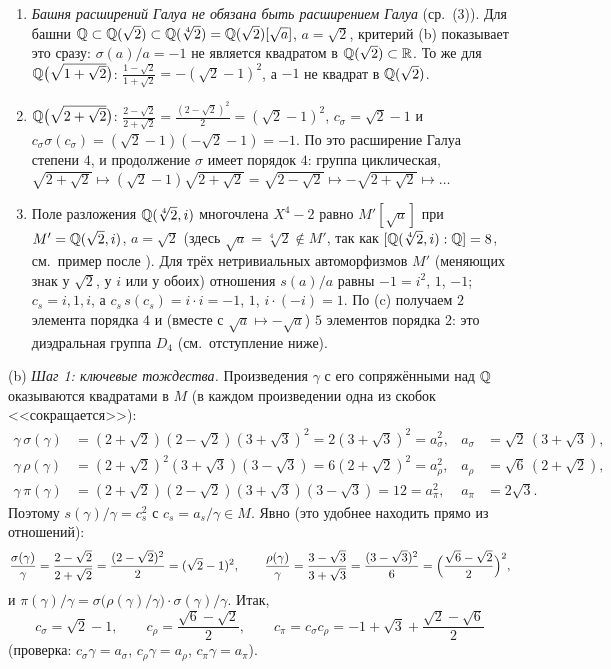 \begin{example}
\begin{enumerate}[label=(\arabic*),leftmargin=*]
\item \emph{Башня расширений Галуа не обязана быть расширением Галуа} (ср.\ (3)). Для башни
$\mathbb Q\subset\mathbb Q(\sqrt2)\subset\mathbb Q(\sqrt[4]2)=\mathbb Q(\sqrt2)[\sqrt a]$, $a=\sqrt2$, критерий (b) показывает это сразу:
$\sigma(a)/a=-1$ не является квадратом в $\mathbb Q(\sqrt2)\subset\mathbb R$. То же для $\mathbb Q\bigl(\sqrt{1+\sqrt2}\bigr)$:
$\frac{1-\sqrt2}{1+\sqrt2}=-(\sqrt2-1)^2$, а $-1$ не квадрат в $\mathbb Q(\sqrt2)$.
\item $\mathbb Q\bigl(\sqrt{2+\sqrt2}\bigr)$: $\frac{2-\sqrt2}{2+\sqrt2}=\frac{(2-\sqrt2)^2}2=(\sqrt2-1)^2$, $c_\sigma=\sqrt2-1$ и
$c_\sigma\sigma(c_\sigma)=(\sqrt2-1)(-\sqrt2-1)=-1$. По  это расширение Галуа степени $4$, и продолжение $\sigma$
имеет порядок $4$: группа циклическая, $\sqrt{2+\sqrt2}\mapsto(\sqrt2-1)\sqrt{2+\sqrt2}=\sqrt{2-\sqrt2}\mapsto-\sqrt{2+\sqrt2}\mapsto\dots$
\item Поле разложения $\mathbb Q(\sqrt[4]2,i)$ многочлена $X^4-2$ равно $M'[\sqrt a]$ при $M'=\mathbb Q(\sqrt2,i)$, $a=\sqrt2$ (здесь $\sqrt a=\sqrt[4]2\notin M'$, так как
$[\mathbb Q(\sqrt[4]2,i):\mathbb Q]=8$, см.\ пример после ). Для трёх
нетривиальных автоморфизмов $M'$ (меняющих знак у $\sqrt2$, у $i$ или у обоих) отношения $s(a)/a$ равны $-1=i^2$, $1$, $-1$;
$c_s=i,1,i$, а $c_s\,s(c_s)=i\cdot i=-1$, $1$, $i\cdot(-i)=1$. По (c) получаем $2$ элемента порядка $4$ и
(вместе с $\sqrt a\mapsto-\sqrt a$) $5$ элементов порядка $2$: это диэдральная группа $D_4$ (см.\ отступление ниже).
\end{enumerate}
\end{example}

\noindent(b) \emph{Шаг 1: ключевые тождества.} Произведения $\gamma$ с его сопряжёнными над $\mathbb Q$ оказываются квадратами в $M$
(в каждом произведении одна из скобок <<сокращается>>):
\begin{align*}
\gamma\,\sigma(\gamma)&=(2+\sqrt2)(2-\sqrt2)(3+\sqrt3)^2=2(3+\sqrt3)^2=a_\sigma^2, & a_\sigma&=\sqrt2\,(3+\sqrt3),\\
\gamma\,\rho(\gamma)&=(2+\sqrt2)^2(3+\sqrt3)(3-\sqrt3)=6(2+\sqrt2)^2=a_\rho^2, & a_\rho&=\sqrt6\,(2+\sqrt2),\\
\gamma\,\pi(\gamma)&=(2+\sqrt2)(2-\sqrt2)(3+\sqrt3)(3-\sqrt3)=12=a_\pi^2, & a_\pi&=2\sqrt3 .
\end{align*}
Поэтому $s(\gamma)/\gamma=c_s^2$ с $c_s=a_s/\gamma\in M$. Явно (это удобнее находить прямо из отношений):
\[
\frac{\sigma(\gamma)}\gamma=\frac{2-\sqrt2}{2+\sqrt2}=\frac{(2-\sqrt2)^2}2=(\sqrt2-1)^2,\qquad
\frac{\rho(\gamma)}\gamma=\frac{3-\sqrt3}{3+\sqrt3}=\frac{(3-\sqrt3)^2}6=\Bigl(\frac{\sqrt6-\sqrt2}2\Bigr)^2,
\]
и $\pi(\gamma)/\gamma=\sigma\bigl(\rho(\gamma)/\gamma\bigr)\cdot\sigma(\gamma)/\gamma$. Итак,
\[
c_\sigma=\sqrt2-1,\qquad c_\rho=\frac{\sqrt6-\sqrt2}2,\qquad c_\pi=c_\sigma c_\rho=-1+\sqrt3+\frac{\sqrt2-\sqrt6}2
\]
(проверка: $c_\sigma\gamma=a_\sigma$, $c_\rho\gamma=a_\rho$, $c_\pi\gamma=a_\pi$).

